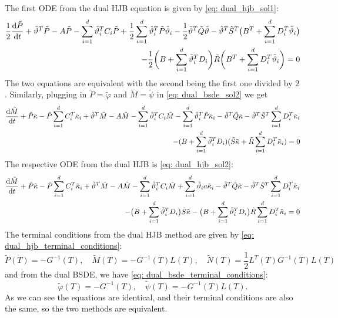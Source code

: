 The first ODE from the dual HJB equation is given by \eqref{eq: dual_hjb_sol1}:
\begin{align*}
    \frac12 \frac{\mathop{}\!\mathrm{d} \tilde{P}}{\mathop{}\!\mathrm{d} t} + \tilde{\vartheta}^T \tilde{P} - A \tilde{P}  - \sum_{i=1}^d \tilde{\vartheta}_i^T C_i \tilde{P} + \frac12 \sum_{i=1}^d \tilde{\vartheta}_i^T \tilde{P} \tilde{\vartheta}_i - \frac12 \tilde{\vartheta}^T \tilde{Q}\tilde{\vartheta} - \tilde{\vartheta}^T \tilde{S}^T \big(B^T + \sum_{i=1}^d D_i^T \tilde{\vartheta}_i \big)\\
    - \frac12 \bigg(B + \sum_{i=1}^d\tilde{\vartheta}_i^T D_i\bigg) \tilde{R} \bigg(B^T + \sum_{i=1}^d D_i^T \tilde{\vartheta}_i\bigg) = 0
\end{align*}
The two equations are equivalent with the second being the first one divided by $2$. Similarly, plugging in $\tilde{P} = \tilde{\varphi}$ and $\tilde{M} = \tilde{\psi}$ in \eqref{eq: dual_bsde_sol2} we get
\begin{align*}
    \frac{\mathop{}\!\mathrm{d} \tilde{M}}{\mathop{}\!\mathrm{d} t} + \tilde{P} \tilde{\kappa} - \tilde{P} \sum_{i=1}^d C_i^T \tilde{\kappa}_i + \tilde{\vartheta}^T \tilde{M} - A \tilde{M} - \sum_{i=1}^d \tilde{\vartheta}_i^T C_i \tilde{M} - \sum_{i=1}^d \tilde{\vartheta}_i^T \tilde{P} \tilde{\kappa}_i-\tilde{\vartheta}^T \tilde{Q} \tilde{\kappa} - \tilde{\vartheta}^T \tilde{S}^T\sum_{i=1}^d D_i^T\tilde{\kappa}_i\\
    - (B + \sum_{i=1}^d\tilde{\vartheta}_i^T D_i) (\tilde{S}\tilde{\kappa} + \tilde{R} \sum_{i=1}^d D_i^T \tilde{\kappa}_i) = 0
\end{align*}
The respective ODE from the dual HJB is \eqref{eq: dual_hjb_sol2}:
\begin{align*}
    \frac{\mathop{}\!\mathrm{d} \tilde{M}}{\mathop{}\!\mathrm{d} t} + \tilde{P} \tilde{\kappa} - \tilde{P} \sum_{i=1}^d C_i^T \tilde{\kappa}_i + \tilde{\vartheta}^T \tilde{M} - A\tilde{M} - \sum_{i=1}^d \tilde{\vartheta}_i^T C_i \tilde{M} 
    + \sum_{i=1}^d\tilde{\vartheta}_i a \tilde{\kappa}_i - \tilde{\vartheta}^T \tilde{Q} \tilde{\kappa} - \tilde{\vartheta}^T \tilde{S}^T \sum_{i=1}^d D_i^T \tilde{\kappa}_i\\
    - \big(B + \sum_{i=1}^d\tilde{\vartheta}_i^T D_i \big)\tilde{S}\tilde{\kappa} - \big( B + \sum_{i=1}^d \tilde{\vartheta}_i^T D_i \big) \tilde{R} \sum_{i=1}^dD_i^T \tilde{\kappa}_i = 0
\end{align*}
The terminal conditions from the dual HJB method are given by \eqref{eq: dual_hjb_terminal_conditions}:
\begin{equation*}
    \tilde{P}(T) = -G^{-1}(T), \quad \tilde{M}(T) = - G^{-1}(T)L(T), \quad \tilde{N}(T) = \frac12 L^T(T)G^{-1}(T)L(T)
\end{equation*}
and from the dual BSDE, we have \eqref{eq: dual_bsde_terminal_conditions}:
\begin{equation*}
    \tilde{\varphi}(T) = - G^{-1}(T), \quad \tilde{\psi}(T) = - G^{-1}(T) L(T).
\end{equation*}
As we can see the equations are identical, and their terminal conditions are also the same, so the two methods are equivalent. 









